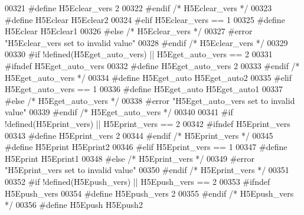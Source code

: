 \begin{DoxyCode}
00321 \textcolor{preprocessor}{    #define H5Eclear\_vers 2}
00322 \textcolor{preprocessor}{  #endif }\textcolor{comment}{/* H5Eclear\_vers */}\textcolor{preprocessor}{}
00323 \textcolor{preprocessor}{  #define H5Eclear H5Eclear2}
00324 \textcolor{preprocessor}{#elif H5Eclear\_vers == 1}
00325 \textcolor{preprocessor}{  #define H5Eclear H5Eclear1}
00326 \textcolor{preprocessor}{#else }\textcolor{comment}{/* H5Eclear\_vers */}\textcolor{preprocessor}{}
00327 \textcolor{preprocessor}{  #error "H5Eclear\_vers set to invalid value"}
00328 \textcolor{preprocessor}{#endif }\textcolor{comment}{/* H5Eclear\_vers */}\textcolor{preprocessor}{}
00329 
00330 \textcolor{preprocessor}{#if !defined(H5Eget\_auto\_vers) || H5Eget\_auto\_vers == 2}
00331 \textcolor{preprocessor}{  #ifndef H5Eget\_auto\_vers}
00332 \textcolor{preprocessor}{    #define H5Eget\_auto\_vers 2}
00333 \textcolor{preprocessor}{  #endif }\textcolor{comment}{/* H5Eget\_auto\_vers */}\textcolor{preprocessor}{}
00334 \textcolor{preprocessor}{  #define H5Eget\_auto H5Eget\_auto2}
00335 \textcolor{preprocessor}{#elif H5Eget\_auto\_vers == 1}
00336 \textcolor{preprocessor}{  #define H5Eget\_auto H5Eget\_auto1}
00337 \textcolor{preprocessor}{#else }\textcolor{comment}{/* H5Eget\_auto\_vers */}\textcolor{preprocessor}{}
00338 \textcolor{preprocessor}{  #error "H5Eget\_auto\_vers set to invalid value"}
00339 \textcolor{preprocessor}{#endif }\textcolor{comment}{/* H5Eget\_auto\_vers */}\textcolor{preprocessor}{}
00340 
00341 \textcolor{preprocessor}{#if !defined(H5Eprint\_vers) || H5Eprint\_vers == 2}
00342 \textcolor{preprocessor}{  #ifndef H5Eprint\_vers}
00343 \textcolor{preprocessor}{    #define H5Eprint\_vers 2}
00344 \textcolor{preprocessor}{  #endif }\textcolor{comment}{/* H5Eprint\_vers */}\textcolor{preprocessor}{}
00345 \textcolor{preprocessor}{  #define H5Eprint H5Eprint2}
00346 \textcolor{preprocessor}{#elif H5Eprint\_vers == 1}
00347 \textcolor{preprocessor}{  #define H5Eprint H5Eprint1}
00348 \textcolor{preprocessor}{#else }\textcolor{comment}{/* H5Eprint\_vers */}\textcolor{preprocessor}{}
00349 \textcolor{preprocessor}{  #error "H5Eprint\_vers set to invalid value"}
00350 \textcolor{preprocessor}{#endif }\textcolor{comment}{/* H5Eprint\_vers */}\textcolor{preprocessor}{}
00351 
00352 \textcolor{preprocessor}{#if !defined(H5Epush\_vers) || H5Epush\_vers == 2}
00353 \textcolor{preprocessor}{  #ifndef H5Epush\_vers}
00354 \textcolor{preprocessor}{    #define H5Epush\_vers 2}
00355 \textcolor{preprocessor}{  #endif }\textcolor{comment}{/* H5Epush\_vers */}\textcolor{preprocessor}{}
00356 \textcolor{preprocessor}{  #define H5Epush H5Epush2}

\end{DoxyCode}
